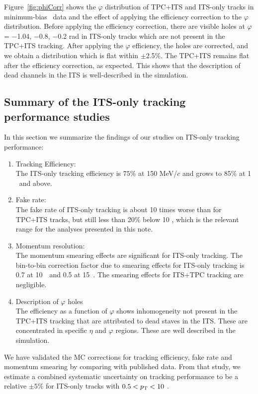 Figure~\ref{fig:phiCorr} shows the $\varphi$ distribution of TPC+ITS and ITS-only tracks in minimum-bias \pPb~data and the effect of applying the efficiency correction to the $\varphi$ distribution. Before applying the efficiency correction, there are visible holes at $\varphi$ = $-$1.04, $-$0.8, $-$0.2 rad in ITS-only tracks which are not present in the TPC+ITS tracking. After applying the $\varphi$ efficiency, the holes are corrected, and we obtain a distribution which is flat within {$\pm$2.5\%}. The TPC+ITS remains flat after the efficiency correction, as expected. This shows that the description of dead channels in the ITS is well-described in the simulation. 

\FloatBarrier
\subsection{Summary of the ITS-only tracking performance studies} 
In this section we summarize the findings of our studies on ITS-only tracking performance: 
\begin{enumerate}
\item Tracking Efficiency: \\
The ITS-only tracking efficiency is $75\%$ at 150 MeV/$c$ and grows to 85$\%$ at 1 \GeVc~and above. 
\item Fake rate:\\
The fake rate of ITS-only tracking is about 10 times worse than for TPC+ITS tracks, but still less than 20$\%$ below 10 \GeVc, which is the relevant range for the analyses presented in this note.
\item Momentum resolution:\\
The momentum smearing effects are significant for ITS-only tracking. The bin-to-bin correction factor due to smearing effects for ITS-only tracking is 0.7 at 10~\GeVc~and 0.5 at 15~\GeVc. The smearing effects for ITS+TPC tracking are negligible.
\item Description of $\varphi$ holes\\
The efficiency as a function of $\varphi$ shows inhomogeneity not present in the TPC+ITS tracking that are attributed to dead staves in the ITS. These are concentrated in specific $\eta$ and $\varphi$ regions. These are well described in the simulation. 
\end{enumerate}

We have validated the MC corrections for tracking efficiency, fake rate and momentum smearing by comparing with published data. From that study, we estimate a combined systematic uncertainty on tracking performance to be a relative $\pm 5\%$ for ITS-only tracks with $0.5 < p_{\mathrm{T}} < 10$ \GeVc. 


